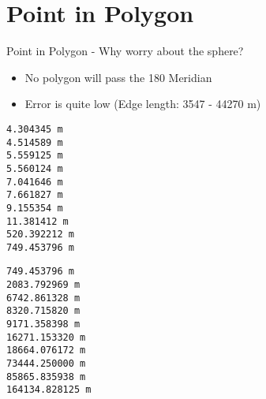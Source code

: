 \section{Point in Polygon}
\begin{frame}[fragile]{Point in Polygon - Why worry about the sphere?}
    \begin{itemize}
        \item No polygon will pass the 180 Meridian \cite{OSM:No180Meridian}
        \item Error is quite low (Edge length: 3547 - 44270 m)
    \end{itemize}
    \begin{minipage}{.45\textwidth}
        \begin{lstlisting}
4.304345 m
4.514589 m
5.559125 m
5.560124 m
7.041646 m
7.661827 m
9.155354 m
11.381412 m
520.392212 m
749.453796 m
        \end{lstlisting}
    \end{minipage}
    \begin{minipage}{.45\textwidth}
        \begin{lstlisting}
749.453796 m
2083.792969 m
6742.861328 m
8320.715820 m
9171.358398 m
16271.153320 m
18664.076172 m
73444.250000 m
85865.835938 m
164134.828125 m
        \end{lstlisting}
    \end{minipage}
\end{frame}
